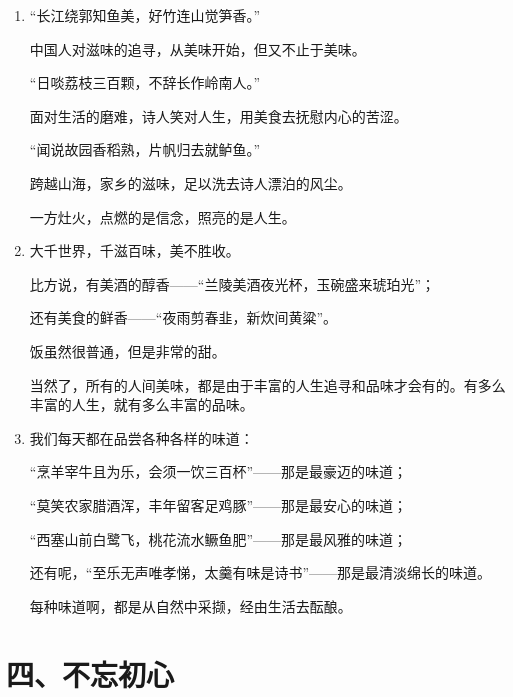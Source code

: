 \begin{enumerate}[leftmargin=*]
    \item “长江绕郭知鱼美，好竹连山觉笋香。”
    
    中国人对滋味的追寻，从美味开始，但又不止于美味。
    
    “日啖荔枝三百颗，不辞长作岭南人。”
    
    面对生活的磨难，诗人笑对人生，用美食去抚慰内心的苦涩。
    
    “闻说故园香稻熟，片帆归去就鲈鱼。”
    
    跨越山海，家乡的滋味，足以洗去诗人漂泊的风尘。
    
    一方灶火，点燃的是信念，照亮的是人生。
    
    \item 大千世界，千滋百味，美不胜收。
    
    比方说，有美酒的醇香——“兰陵美酒夜光杯，玉碗盛来琥珀光”；
    
    还有美食的鲜香——“夜雨剪春韭，新炊间黄粱”。
    
    饭虽然很普通，但是非常的甜。
    
    当然了，所有的人间美味，都是由于丰富的人生追寻和品味才会有的。有多么丰富的人生，就有多么丰富的品味。
    
    \item 我们每天都在品尝各种各样的味道：
    
    “烹羊宰牛且为乐，会须一饮三百杯”——那是最豪迈的味道；
    
    “莫笑农家腊酒浑，丰年留客足鸡豚”——那是最安心的味道；
    
    “西塞山前白鹭飞，桃花流水鳜鱼肥”——那是最风雅的味道；
    
    还有呢，“至乐无声唯孝悌，太羹有味是诗书”——那是最清淡绵长的味道。
    
    每种味道啊，都是从自然中采撷，经由生活去酝酿。
\end{enumerate}

\newpage

\section*{四、不忘初心}

